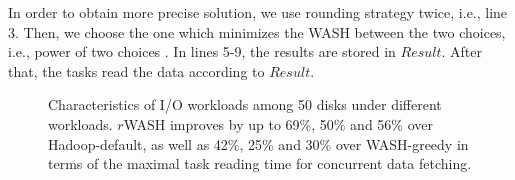 \documentclass[conference]{IEEEtran}
\begin{document}
In order to obtain more precise solution, we use rounding strategy twice, i.e., line 3. Then, we choose the one which minimizes the WASH between the two choices, i.e., power of two choices \cite{b43}. In lines 5-9, the results are stored in $Result$. After that, the tasks read the data according to $Result$. 

\begin{figure}[!t]
	\centering
	\quad\quad %
	\quad\quad
	\vspace{-1ex}
	\caption{Characteristics of I/O workloads among 50 disks under different workloads. $r$WASH improves by up to 69\%, 50\% and 56\% over Hadoop-default, as well as 42\%, 25\% and 30\% over WASH-greedy in terms of the maximal task reading time for concurrent data fetching.}
	\label{Fig:instance}
\end{figure}
\end{document}
